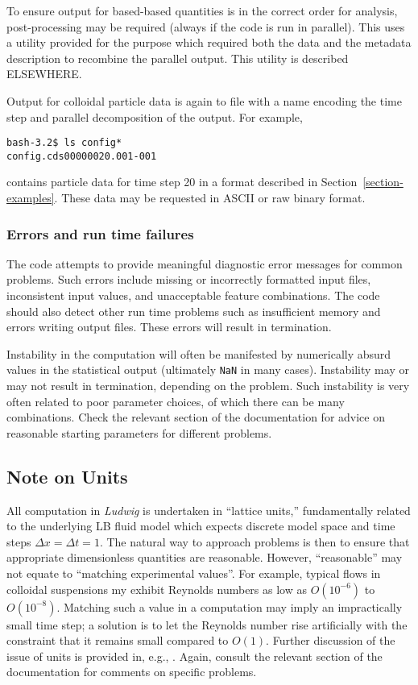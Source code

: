 To ensure output for based-based quantities is in the correct order for
analysis, post-processing
may be required (always if the code is run in parallel). This uses a utility
provided for the purpose which required both the data and the metadata
description to recombine the parallel output. This utility is described
ELSEWHERE.

Output for colloidal particle data is again to file with a name encoding
the time step and parallel decomposition of the output. For example,
\begin{lstlisting}
bash-3.2$ ls config*
config.cds00000020.001-001
\end{lstlisting}
contains particle data for time step 20 in a format described in
Section~\ref{section-examples}.
These data may be requested in ASCII or raw binary format.

\subsubsection{Errors and run time failures}

The code attempts to provide meaningful diagnostic error messages
for common problems. Such errors include missing or incorrectly
formatted input files, inconsistent input values, and unacceptable
feature combinations. The code should also detect other run time
problems such as insufficient memory and errors writing output
files. These errors will result in termination.

Instability in the computation will often be manifested by numerically
absurd values in the statistical output (ultimately \texttt{NaN} in
many cases). Instability may or may not result in termination, depending
on the problem. Such instability is very often related to poor parameter
choices, of which there can be many combinations. Check the
relevant section of the documentation for advice on reasonable starting
parameters for different problems.


\subsection{Note on Units}

All computation in \textit{Ludwig} is undertaken in ``lattice
units,'' fundamentally related to the underlying LB fluid model
which expects discrete model space and time steps
$\Delta x = \Delta t = 1$. The natural way to approach problems
is then to ensure that appropriate dimensionless quantities are
reasonable. However, ``reasonable'' may not equate to ``matching
experimental values''. For example, typical flows in colloidal
suspensions my exhibit Reynolds numbers as low as $O(10^{-6})$
to $O(10^{-8})$.
Matching such a value in a computation may imply an impractically
small time step; a solution is to let the Reynolds number rise
artificially with the constraint that it remains small compared to $O(1)$.
Further discussion of the issue of units is provided in, e.g.,
\cite{cates_scaling}. Again, consult the relevant section of the documentation
for comments on specific problems.


\vfill
\pagebreak
